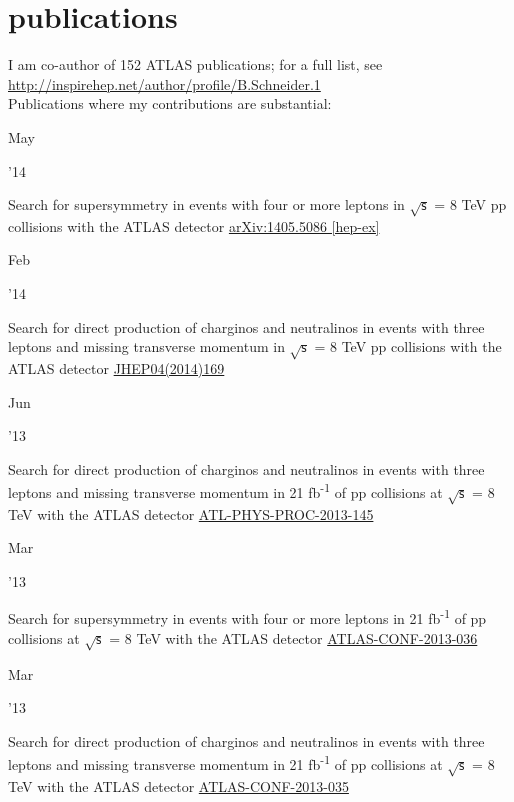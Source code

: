 \documentclass[]{cv} %
\begin{document}
\section{publications}
\begin{entrylist}

  \entry
  {}
  {I am co-author of 152 ATLAS publications; for a full list, see \\
\href{http://inspirehep.net/author/profile/B.Schneider.1}{http://inspirehep.net/author/profile/B.Schneider.1}\\
Publications where my contributions are substantial:}
{}
  {\vspace*{\spacingPubs}}

  \entry
  {\parbox[t]{\parboxWidthOne}{May}\parbox[t]{\parboxWidthTwo}{\hfill '14}}
  {Search for supersymmetry in events with four or more leptons in $\sqrt{\mathsf{s}}$ = 8 TeV pp collisions with the ATLAS detector}
  {\href{http://arxiv.org/abs/1405.5086}{arXiv:1405.5086 [hep-ex]}}
  {\vspace*{\spacingPubs}}

  \entry
  {\parbox[t]{\parboxWidthOne}{Feb}\parbox[t]{\parboxWidthTwo}{\hfill '14}}
  {Search for direct production of charginos and neutralinos in events with three leptons and missing transverse momentum in $\sqrt{\mathsf{s}}$ =
  8 TeV pp collisions with the ATLAS detector}
  {\href{http://dx.doi.org/10.1007/JHEP04(2014)169}{JHEP04(2014)169}}
  {\vspace*{\spacingPubs}}

  \entry
  {\parbox[t]{\parboxWidthOne}{Jun}\parbox[t]{\parboxWidthTwo}{\hfill '13}}
  {Search for direct production of charginos and neutralinos in events with three leptons and missing transverse momentum in 21
    fb\textsuperscript{-1} of pp collisions at $\sqrt{\mathsf{s}}$ = 8 TeV with the ATLAS detector}
  {\href{https://cds.cern.ch/record/1554811}{ATL-PHYS-PROC-2013-145}}
  {\vspace*{\spacingPubs}}

  \entry
  {\parbox[t]{\parboxWidthOne}{Mar}\parbox[t]{\parboxWidthTwo}{\hfill '13}}
  {Search for supersymmetry in events with four or more leptons in 21 fb\textsuperscript{-1} of pp collisions at
  $\sqrt{\mathsf{s}}$ = 8 TeV with the ATLAS detector}
{\href{https://cds.cern.ch/record/1532429}{ATLAS-CONF-2013-036}}
{\vspace*{\spacingPubs}}

  \entry
  {\parbox[t]{\parboxWidthOne}{Mar}\parbox[t]{\parboxWidthTwo}{\hfill '13}}
  {Search for direct production of charginos and neutralinos in events with three leptons and missing transverse momentum in 21
    fb\textsuperscript{-1} of pp collisions at $\sqrt{\mathsf{s}}$ = 8 TeV with the ATLAS detector}
  {\href{https://cds.cern.ch/record/1532426}{ATLAS-CONF-2013-035}}
  {\vspace*{\spacingPubs}}


\end{entrylist}
\end{document}
